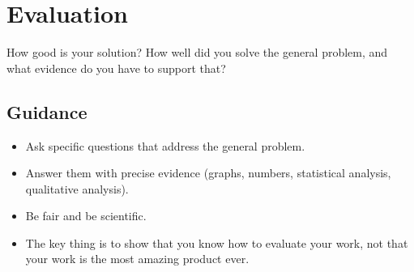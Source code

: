 \documentclass{l4proj}
\begin{document}




\chapter{Evaluation} 
How good is your solution? How well did you solve the general problem, and what evidence do you have to support that?

\section{Guidance}
\begin{itemize}
    \item
        Ask specific questions that address the general problem.
    \item
        Answer them with precise evidence (graphs, numbers, statistical
        analysis, qualitative analysis).
    \item
        Be fair and be scientific.
    \item
        The key thing is to show that you know how to evaluate your work, not
        that your work is the most amazing product ever.
\end{itemize}
\end{document}
